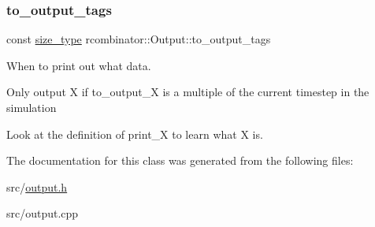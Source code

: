 \subsubsection{\texorpdfstring{to\+\_\+output\+\_\+tags}{to\_output\_tags}}
{\footnotesize\ttfamily const \mbox{\hyperlink{constants_8h_abcd18a5521fc90ff6e7b00e4fee98397}{size\+\_\+type}} rcombinator\+::\+Output\+::to\+\_\+output\+\_\+tags\hspace{0.3cm}{\ttfamily [private]}}



When to print out what data. 


\begin{DoxyItemize}
\item Only output X if {\ttfamily to\+\_\+output\+\_\+X} is a multiple of the current timestep in the simulation
\item Look at the definition of print\+\_\+\textquotesingle{}X\textquotesingle{} to learn what \textquotesingle{}X\textquotesingle{} is. 
\end{DoxyItemize}

The documentation for this class was generated from the following files\+:\begin{DoxyCompactItemize}
\item 
src/\mbox{\hyperlink{output_8h}{output.\+h}}\item 
src/output.\+cpp\end{DoxyCompactItemize}

